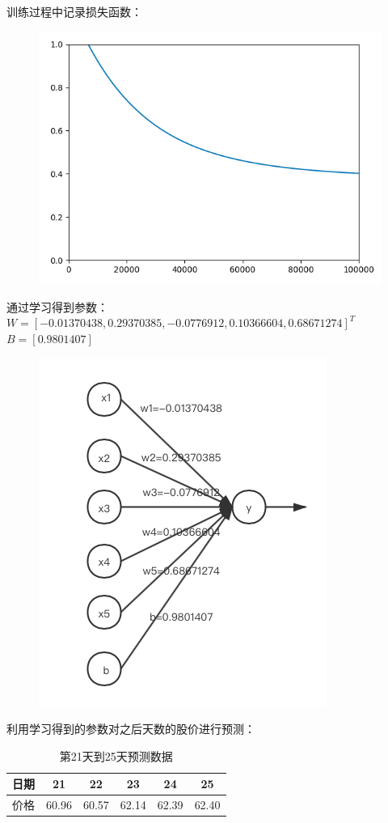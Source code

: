 \documentclass{article}
\begin{document}
训练过程中记录损失函数：
\begin{figure}[H]
	\centering
	\includegraphics[scale=0.6]{loss.png}
\end{figure}

通过学习得到参数：\\
$ W=[-0.01370438, 0.29370385, -0.0776912, 0.10366604, 0.68671274]^{T} $
$ B=[0.9801407] $\\
\begin{figure}[H]
	\centering
	\includegraphics[scale=0.6]{流程图.png}
\end{figure}

利用学习得到的参数对之后天数的股价进行预测：
\begin{table}[htbp]
	\centering
	\caption{第21天到25天预测数据}
	\begin{tabular}{cccccc}
		\toprule    日期 & 21 & 22& 23& 24&25 \\
		\midrule   价格 & 60.96 & 60.57 &  62.14 & 62.39 & 62.40  \\
		\bottomrule   
	\end{tabular}  
\end{table}
\end{document}
